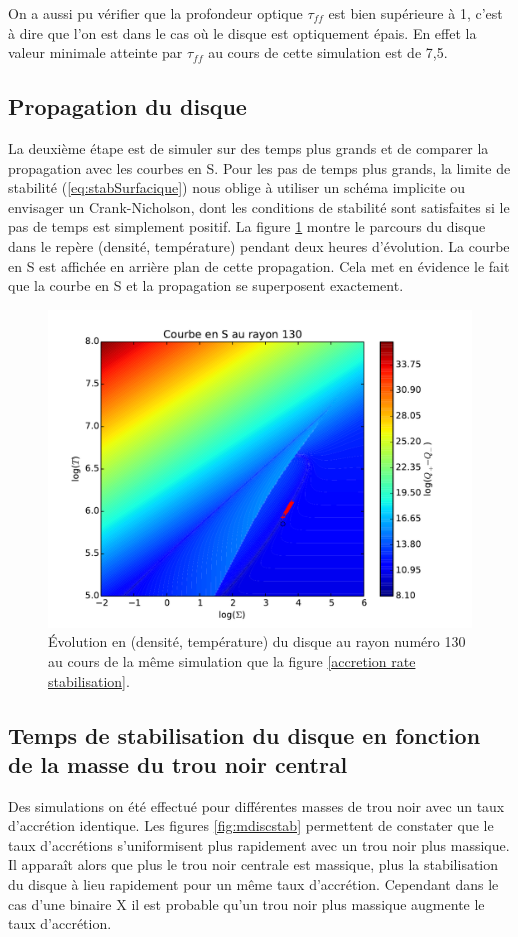 \documentclass[a4paper,12pt]{article}
\begin{document}
On a aussi pu vérifier que la profondeur optique $\tau_{ff}$ est bien supérieure à 1, c'est à dire que l'on est dans le cas où le disque est optiquement épais. En effet la valeur minimale atteinte par $\tau_{ff}$ au cours de cette simulation est de 7,5.


\subsection{Propagation du disque}

La deuxième étape est de simuler sur des temps plus grands et de comparer la propagation avec les courbes en S. Pour les pas de temps plus grands, la limite de stabilité (\ref{eq:stabSurfacique}) nous oblige à utiliser un schéma implicite ou envisager un Crank-Nicholson, dont les conditions de stabilité sont satisfaites si le pas de temps est simplement positif. La figure \ref{scourbe} montre le parcours du disque dans le repère (densité, température) pendant deux heures d'évolution. La courbe en S est affichée en arrière plan de cette propagation. Cela met en évidence le fait que la courbe en S et la propagation se superposent exactement.

\begin{figure}
  \centering
  \includegraphics[width=0.60\linewidth]{SLog-130.pdf}
  \caption{Évolution en (densité, température) du disque au rayon numéro 130 au cours de la même simulation que la figure \ref{accretion rate stabilisation}.}
  \label{scourbe}
\end{figure}

\subsection{Temps de stabilisation du disque en fonction de la masse du trou noir central}

Des simulations on été effectué pour différentes masses de trou noir avec un taux d'accrétion identique. Les figures \ref{fig:mdiscstab} permettent de constater que le taux d'accrétions s'uniformisent plus rapidement avec un trou noir plus massique. Il apparaît alors que plus le trou noir centrale est massique, plus la stabilisation du disque à lieu rapidement pour un même taux d'accrétion. Cependant dans le cas d'une binaire X il est probable qu'un trou noir plus massique augmente le taux d'accrétion.
\end{document}
